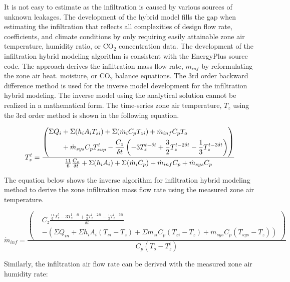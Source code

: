 \documentclass[11pt]{article}
\begin{document}
It is not easy to estimate as the infiltration is caused by various sources of unknown leakages. The development of the hybrid model fills the gap when estimating the infiltration that reflects all complexities of design flow rate, coefficients, and climate conditions by only requiring easily attainable zone air temperature, humidity ratio, or CO$_2$ concentration data. The development of the infiltration hybrid modeling algorithm is consistent with the EnergyPlus source code. The approach derives the infiltration mass flow rate, $\dot{m}_{inf}$ by reformulating the zone air heat. moisture, or CO$_2$ balance equations. The 3rd order backward difference method is used for the inverse model development for the infiltration hybrid modeling. The inverse model using the analytical solution cannot be realized in a mathematical form. The time-series zone air temperature, $T_z$ using the 3rd order method is shown in the following equation.

\begin{equation}
T_z^t = \\ \frac {\left(\begin{aligned}\Sigma Q_i &+ \Sigma(h_i A_i T_{si}) + \Sigma (\dot{m}_i C_p T_{zi}) + \dot{m}_{inf} C_p T_o\\ &+ \dot{m}_{sys} C_p T_{sup}^t - \frac{C_z}{\delta t}\left(-3T_z^{t-\delta t} + \frac {3} {2} T_z^{t-2\delta t} - \frac {1} {3} T_z^{t-3\delta t}\right)\end{aligned}\right)} { \frac {11}{6} \frac {C_z} {\delta t} + \Sigma (h_i A_i)  + \Sigma (\dot{m}_i C_p) + \dot{m}_{inf} C_p + \dot{m}_{sys} C_p}
\end{equation}

The equation below shows the inverse algorithm for infiltration hybrid modeling method to derive the zone infiltration mass flow rate using the measured zone air temperature.

\begin{equation}
\dot{m}_{inf} = \frac{\left(\begin{aligned}& C_z\frac {\frac{11}{6}T_{z}^{t}-3T_{z}^{t-\delta t}+\frac{3}{2}T_{z}^{t-2\delta t}-\frac{1}{3}T_{z}^{t-3\delta t}} {\delta t}\\ & - \left(\Sigma{Q_{in}}+\Sigma{h_i A_i (T_{si}-T_z)} + \Sigma{\dot{m}_{zi}C_p(T_{zi}-T_z)} + \dot{m}_{sys}C_p(T_{sys} - T_z)\right)\end{aligned}\right)} {C_p(T_o - T_{z}^{t})}
\end{equation}

Similarly, the infiltration air flow rate can be derived with the measured zone air humidity rate:
\end{document}

